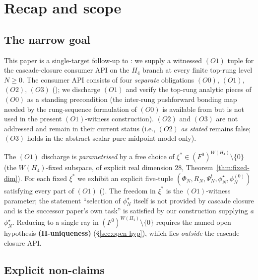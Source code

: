 \documentclass[11pt]{article}
\theoremstyle{definition}
\begin{document}
\section{Recap and scope}
\label{sec:intro}

\subsection{The narrow goal}

This paper is a single-target follow-up to
\cite{CascadeMechanism}: we supply a witnessed $(O1)$ tuple for
the cascade-closure consumer API on the $H_4$ branch at every
finite top-rung level $N \geq 0$. The
\cite[\S 3.4]{CascadeMechanism} consumer API consists of four
\emph{separate} obligations $(O0)$, $(O1)$, $(O2)$, $(O3)$
(\cite[lines 594--627]{CascadeMechanism}); we discharge $(O1)$
and verify the top-rung analytic pieces of $(O0)$ as a standing
precondition (the inter-rung pushforward bonding map needed by
the rung-sequence formulation of $(O0)$ is available from
\cite[Definition~\texttt{def:p0}, Theorem~\texttt{thm:bonding}]
{RefinementSpaces} but is not used in the present
$(O1)$-witness construction). $(O2)$ and $(O3)$
are not addressed and remain in their current
\cite{RefinementCompat} status (i.e., $(O2)$ \emph{as stated}
remains false; $(O3)$ holds in the abstract scalar pure-midpoint
model only).

The $(O1)$ discharge is \emph{parametrised} by a free choice of
$\xi^{*} \in (F^0)^{W(H_4)} \setminus \{0\}$ (the
$W(H_4)$-fixed subspace, of explicit real dimension $28$,
Theorem~\ref{thm:fixed-dim}). For each fixed $\xi^{*}$ we
exhibit an explicit five-tuple
$(\Phi_N, R_N, \Psi_N^{t}, \phi^{\star}_{N}, \phi_N^{(0)})$
satisfying every part of $(O1)$
(\cite[lines 609--617]{CascadeMechanism}). The freedom in
$\xi^{*}$ is the $(O1)$-witness parameter; the
\cite[\S 3.4 lines 637--639]{CascadeMechanism} statement
``selection of $\phi^{\star}_{N}$ itself is not provided by
cascade closure and is the successor paper's own task'' is
satisfied by our construction supplying \emph{a} $\phi^{\star}_{N}$.
Reducing to a single ray in $(F^0)^{W(H_4)} \setminus \{0\}$
requires the named open hypothesis \textbf{(H-uniqueness)}
(\S\ref{sec:open-hyp}), which lies \emph{outside} the
cascade-closure API.

\subsection{Explicit non-claims}
\end{document}

